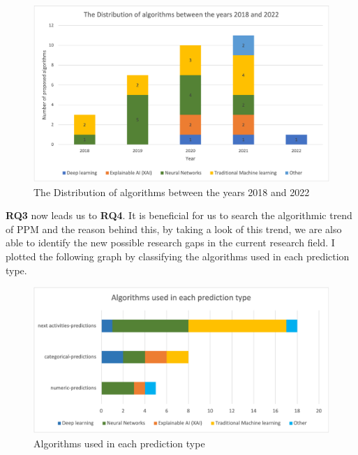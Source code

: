 \documentclass[runningheads]{llncs}
\begin{document}
		\begin{figure}
		\includegraphics[scale=0.4]{Distribution_algorithms.png}
		\centering
		\caption{The Distribution of algorithms between the years 2018 and 2022}
		\end{figure}
		
		\textbf{RQ3} now leads us to \textbf{RQ4}. It is beneficial for us to search the algorithmic trend of PPM and the reason behind this, by taking a look of this trend, we are also able to identify the new possible research gaps in the current research field. I plotted the following graph by classifying the algorithms used in each prediction type. 
		
		\begin{figure}
		\includegraphics[scale=0.6]{Algorithms_usage.png}
		\centering
		\caption{Algorithms used in each prediction type}
		\end{figure}
		
		
		
		
\end{document}
